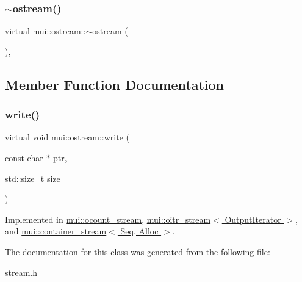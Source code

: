 \subsubsection{\texorpdfstring{$\sim$ostream()}{~ostream()}}
{\footnotesize\ttfamily virtual mui\+::ostream\+::$\sim$ostream (\begin{DoxyParamCaption}{ }\end{DoxyParamCaption})\hspace{0.3cm}{\ttfamily [inline]}, {\ttfamily [virtual]}}



\subsection{Member Function Documentation}
\mbox{\label{classmui_1_1ostream_a93a0a1d32007efc375d885181c833995}} 
\subsubsection{\texorpdfstring{write()}{write()}}
{\footnotesize\ttfamily virtual void mui\+::ostream\+::write (\begin{DoxyParamCaption}\item[{const char $\ast$}]{ptr,  }\item[{std\+::size\+\_\+t}]{size }\end{DoxyParamCaption})\hspace{0.3cm}{\ttfamily [pure virtual]}}



Implemented in \hyperlink{classmui_1_1ocount__stream_a7d536099a215a5546eef065634b7ea67}{mui\+::ocount\+\_\+stream}, \hyperlink{classmui_1_1oitr__stream_aa726d0d57ba12ede019d019d382eb4cf}{mui\+::oitr\+\_\+stream$<$ Output\+Iterator $>$}, and \hyperlink{classmui_1_1container__stream_a47bb31cd5e33311702d15e43f87cdc92}{mui\+::container\+\_\+stream$<$ Seq, Alloc $>$}.



The documentation for this class was generated from the following file\+:\begin{DoxyCompactItemize}
\item 
\hyperlink{stream_8h}{stream.\+h}\end{DoxyCompactItemize}
